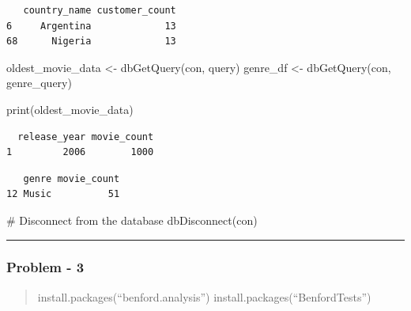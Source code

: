 \documentclass[
  12pt,
]{article}
\newenvironment{Shaded}{\begin{snugshade}}{\end{snugshade}}
\newcommand{\CommentTok}[1]{\textcolor[rgb]{0.37,0.37,0.37}{#1}}
\newcommand{\FunctionTok}[1]{\textcolor[rgb]{0.28,0.35,0.67}{#1}}
\newcommand{\NormalTok}[1]{\textcolor[rgb]{0.00,0.23,0.31}{#1}}
\newcommand{\OtherTok}[1]{\textcolor[rgb]{0.00,0.23,0.31}{#1}}
\newcommand{\SpecialCharTok}[1]{\textcolor[rgb]{0.37,0.37,0.37}{#1}}
\begin{document}
\begin{verbatim}
   country_name customer_count
6     Argentina             13
68      Nigeria             13
\end{verbatim}

\begin{Shaded}
\begin{Highlighting}[]
\NormalTok{oldest\_movie\_data }\OtherTok{\textless{}{-}} \FunctionTok{dbGetQuery}\NormalTok{(con, query)}
\NormalTok{genre\_df }\OtherTok{\textless{}{-}} \FunctionTok{dbGetQuery}\NormalTok{(con, genre\_query)}


\FunctionTok{print}\NormalTok{(oldest\_movie\_data)}
\end{Highlighting}
\end{Shaded}

\begin{verbatim}
  release_year movie_count
1         2006        1000
\end{verbatim}

\begin{Shaded}
\end{Shaded}

\begin{verbatim}
   genre movie_count
12 Music          51
\end{verbatim}

\begin{Shaded}
\begin{Highlighting}[]
\CommentTok{\# Disconnect from the database}
\FunctionTok{dbDisconnect}\NormalTok{(con)}
\end{Highlighting}
\end{Shaded}

\begin{center}\rule{0.5\linewidth}{0.5pt}\end{center}

\subsubsection{Problem - 3}\label{problem---3}

\begin{quote}
install.packages(``benford.analysis'')
install.packages(``BenfordTests'')
\end{quote}
\end{document}
